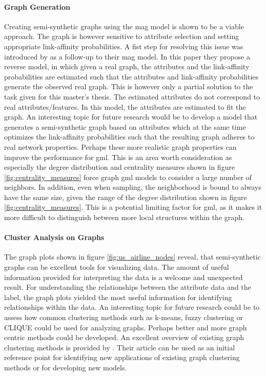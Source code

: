   \paragraph{Graph Generation} \mbox{}
  
  \noindent Creating semi-synthetic graphs using the \acs{mag} model is shown to 
  be a viable approach. The graph is however sensitive to attribute selection and 
  setting appropriate link-affinity probabilities. A fist step for resolving
  this issue was introduced by \cite{kim2011modeling} as a follow-up to their
  \acs{mag} model. In this paper they propose a reverse model, in which given a real
  graph, the attributes and the link-affinity probabilities are estimated such 
  that the attributes and link-affinity probabilities generate the observed real
  graph. This is however only a partial solution to the task given for this
  master's thesis. The estimated attributes do not correspond to real 
  attributes/features. In this model, the attributes are estimated to fit the 
  graph. An interesting topic for future research would be to develop a model 
  that generates a semi-synthetic graph based on attributes which at the same
  time optimizes the link-affinity probabilities such that the resulting graph
  adheres to real network properties. Perhaps these more realistic graph 
  properties can improve the performance for \acs{gml}. This is an area worth 
  consideration as especially the degree distribution and centrality measures 
  shown in figure \ref{fig:centrality_measures} force graph \acs{gml} models to 
  consider a large number of neighbors. In addition, even when sampling, the 
  neighborhood is bound to always have the same size, given the range of the
  degree distribution shown in figure \ref{fig:centrality_measures}. This is a
  potential limiting factor for \acs{gml}, as it makes it more difficult to 
  distinguish between more local structures within the graph.

  \paragraph{Cluster Analysis on Graphs} \mbox{}

  \noindent The graph plots shown in figure \ref{fig:us_airline_nodes} reveal,
  that semi-synthetic graphs can be excellent tools for visualizing data. The
  amount of useful information provided for interpreting the data is a welcome
  and unexpected result. For understanding the relationships between the
  attribute data and the label, the graph plots yielded the most useful
  information for identifying relationships within the data. An interesting
  topic for future research could be to assess how common clustering methods
  such as k-means, fuzzy clustering or CLIQUE could be used for analyzing
  graphs. Perhaps better and more graph centric methods could be developed. An
  excellent overview of existing graph clustering methods is provided by
  \cite{zhou2020graph}. Their article can be used as an initial reference point
  for identifying new applications of existing graph clustering methods or for 
  developing new models.

